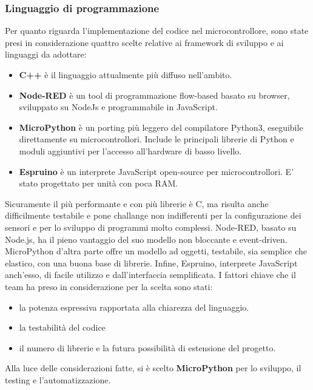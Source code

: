         \subsubsection{Linguaggio di programmazione}
        Per quanto riguarda l'implementazione del codice nel microcontrollore, sono state presi in considerazione quattro scelte relative ai framework di sviluppo e ai linguaggi da adottare: 
        \begin{itemize}
            \item \textbf{C++} è il linguaggio attualmente più diffuso nell'ambito. 
            \item \textbf{Node-RED} è un tool di programmazione flow-based basato su browser, sviluppato su NodeJs e programmabile in JavaScript.
            \item \textbf{MicroPython} è un porting più leggero del compilatore Python3, eseguibile direttamente su microcontrollori. Include le principali librerie di Python e moduli aggiuntivi per l'accesso all'hardware di basso livello.
            \item \textbf{Espruino} è un interprete JavaScript open-source per microcontrollori. E' stato progettato per unità con poca RAM.
        \end{itemize}
        Sicuramente il più performante e con più librerie è C, ma risulta anche difficilmente testabile e pone challange non indifferenti per la configurazione dei sensori e per lo sviluppo di programmi molto complessi. Node-RED, basato su Node.js, ha il pieno vantaggio del suo modello non bloccante e event-driven. MicroPython d'altra parte offre un modello ad oggetti, testabile, sia semplice che elastico, con una buona base di librerie. Infine, Espruino, interprete JavaScript anch'esso, di facile utilizzo e dall'interfaccia semplificata. 
        I fattori chiave che il team ha preso in considerazione per la scelta sono stati: 
        \begin{itemize}
            \item la potenza espressiva rapportata alla chiarezza del linguaggio. 
            \item la testabilità del codice
            \item il numero di librerie e la futura possibilità di estensione del progetto.
        \end{itemize}
        Alla luce delle considerazioni fatte, si è scelto  \textbf{MicroPython} per lo sviluppo, il testing e l'automatizzazione.
